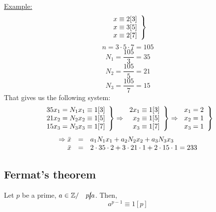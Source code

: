 \documentclass{report}
\begin{document}
\underline{Example:}
\[
\left.
\begin{array}{r c l}
x \equiv 2 [3]\\
x \equiv 3 [5]\\
x \equiv 2 [7]\\
\end{array}
\right \}
\]
\[ n=3 \cdot 5 \cdot 7 = 105 \]
\[N_1=\frac{105}{3}=35\]
\[N_2=\frac{105}{5}=21\]
\[N_3=\frac{105}{7}=15\]
That gives us the following system:
\[
\left.
\begin{array}{r c l}
35x_1=N_1 x_1 \equiv 1[3]\\
21x_2=N_2 x_2 \equiv 1[5]\\
15x_3=N_3 x_3 \equiv 1[7]\\
\end{array}
\right \}
\Rightarrow
\left .
\begin{array}{r c l}
2x_1 \equiv 1[3]\\
x_2 \equiv 1 [5]\\
x_3 \equiv 1 [7]\\
\end{array}
\right \}
\Rightarrow
\left.
\begin{array}{r c l}
x_1=2\\
x_2=1\\
x_3=1\\
\end{array}
\right \}
\]
\[ 
\begin{array}{r c l}
\Rightarrow \bar{x}&=&a_1N_1x_1+a_2N_2x_2+a_3N_3x_3\\
\bar{x}&=& 2 \cdot 35 \cdot 2 + 3 \cdot 21 \cdot 1 + 2 \cdot 15 \cdot 1 = 233\\
\end{array}
\]
\newpage
\subsection*{Fermat's theorem}
Let $p$ be a prime, $a \in \mathbb{Z} / \quad p \cancel{\mid} a$. Then,
\[ a^{p-1} \equiv 1 [p] \]
\end{document}
